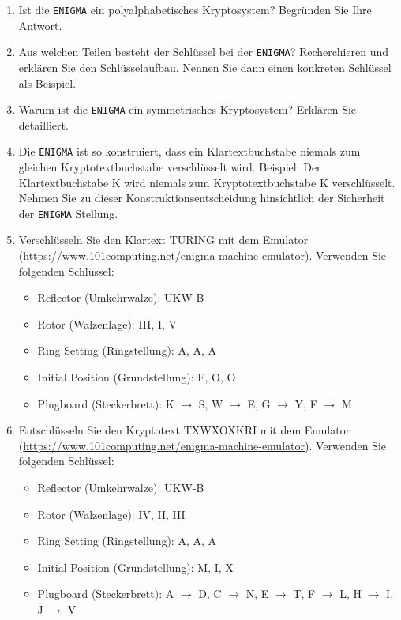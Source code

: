 \begin{enumerate}
\item Ist die \texttt{ENIGMA} ein polyalphabetisches Kryptosystem? Begründen Sie Ihre Antwort.


\newpage

\item Aus welchen Teilen besteht der Schlüssel bei der \texttt{ENIGMA}? Recherchieren und erklären Sie den Schlüsselaufbau. Nennen Sie dann einen konkreten Schlüssel als Beispiel.

\fillwithgrid{2in}

\item Warum ist die \texttt{ENIGMA} ein symmetrisches Kryptosystem? Erklären Sie detailliert.

\fillwithgrid{1in}

\item Die \texttt{ENIGMA} ist so konstruiert, dass ein Klartextbuchstabe niemals zum gleichen Kryptotextbuchstabe verschlüsselt wird. Beispiel: Der Klartextbuchstabe K wird niemals zum Kryptotextbuchstabe K verschlüsselt. Nehmen Sie zu dieser Konstruktionsentscheidung hinsichtlich der Sicherheit der \texttt{ENIGMA} Stellung.

\fillwithgrid{1in}

\item Verschlüsseln Sie den Klartext TURING mit dem Emulator (\url{https://www.101computing.net/enigma-machine-emulator}). Verwenden Sie folgenden Schlüssel:
\begin{itemize}
\item Reflector (Umkehrwalze): UKW-B
\item Rotor (Walzenlage): \textrm{III}, \textrm{I}, \textrm{V}
\item Ring Setting (Ringstellung): A, A, A
\item Initial Position (Grundstellung): F, O, O
\item Plugboard (Steckerbrett): K $\rightarrow$ S, W $\rightarrow$ E, G $\rightarrow$ Y, F $\rightarrow$ M
\end{itemize}

\fillwithgrid{0.25in}


\item Entschlüsseln Sie den Kryptotext TXWXOXKRI mit dem Emulator (\url{https://www.101computing.net/enigma-machine-emulator}). Verwenden Sie folgenden Schlüssel:
\begin{itemize}
\item Reflector (Umkehrwalze): UKW-B
\item Rotor (Walzenlage): \textrm{IV}, \textrm{II}, \textrm{III}
\item Ring Setting (Ringstellung): A, A, A
\item Initial Position (Grundstellung): M, I, X
\item Plugboard (Steckerbrett): A $\rightarrow$ D, C $\rightarrow$ N, E $\rightarrow$ T, F $\rightarrow$ L, H $\rightarrow$ I, J $\rightarrow$ V
\end{itemize}


\fillwithgrid{0.25in}

\end{enumerate}
